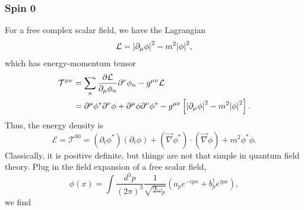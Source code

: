 \documentclass[11pt]{article}
\theoremstyle{definition}
\begin{document}
\subsubsection{Spin 0}
For a free complex scalar field, we have the Lagrangian
\begin{equation}
    \mathcal{L} = \abs{\partial_\mu\phi}^2 - m^2\abs{\phi}^2,
\end{equation}
which has energy-momentum tensor
\begin{equation}
    \begin{aligned}
        \mathcal{T}^{\mu\nu} &= \sum_n \frac{\partial\mathcal{L}}{\partial_\mu\phi_n}\partial^\nu\phi_n - g^{\mu\nu}\mathcal{L} \\
        &= \partial^\mu\phi^*\partial^\nu\phi + \partial^\mu\phi\partial^\nu\phi^* - g^{\mu\nu}\left[\abs{\partial_\mu\phi}^2 - m^2\abs{\phi}^2\right].
    \end{aligned}
\end{equation}
Thus, the energy density is
\begin{equation}
    \mathcal{E} = \mathcal{T}^{00} = (\partial_t\phi^*)(\partial_t\phi) + (\vec{\nabla}\phi^*)\cdot(\vec{\nabla}\phi) + m^2\phi^*\phi.
\end{equation}
Classically, it is positive definite, but things are not that simple in quantum field theory. Plug in the field expansion of a free scalar field,
\begin{equation}
    \phi(x) = \int \frac{d^3p}{(2\pi)^3}\frac{1}{\sqrt{2\omega_p}}(a_pe^{-ipx} + b_p^\dagger e^{ipx}),
\end{equation}
we find
\end{document}
